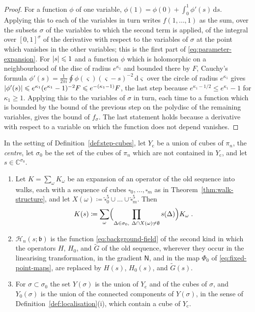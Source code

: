 \documentclass[11pt]{preprint}
\newcommand{\dd}{\mathrm{d}}
\DeclarePairedDelimiter{\abs}{\lvert}{\rvert}
\numberwithin{equation}{section}
\begin{document}
\begin{proof}
For a function $\phi$ of one variable, $\phi(1) = \phi(0) + \int_0^1\phi'(s)\,\dd s$. Applying this to each of the variables in turn writes $f(1, \dots, 1)$ as the sum, over the subsets $\sigma$ of the variables to which the second term is applied, of the integral over $[0, 1]^\sigma$ of the derivative with respect to the variables of $\sigma$ at the point which vanishes in the other variables; this is the first part of \eqref{eq:parameter-expansion}. For $\abs s \leqslant 1$ and a function $\phi$ which is holomorphic on a neighbourhood of the disc of radius $e^{\kappa_1}$ and bounded there by $F$, Cauchy's formula $\phi'(s) = \frac{1}{2\pi i}\oint\phi(\varsigma)(\varsigma - s)^{-2}\,\dd\varsigma$ over the circle of radius $e^{\kappa_1}$ gives $\abs{\phi'(s)} \leqslant e^{\kappa_1}(e^{\kappa_1} - 1)^{-2}F \leqslant e^{-(\kappa_1 - 1)}F$, the last step because $e^{\kappa_1 - 1/2} \leqslant e^{\kappa_1} - 1$ for $\kappa_1 \geqslant 1$. Applying this to the variables of $\sigma$ in turn, each time to a function which is bounded by the bound of the previous step on the polydisc of the remaining variables, gives the bound of $f_\sigma$. The last statement holds because a derivative with respect to a variable on which the function does not depend vanishes.
\end{proof}

\begin{definition}\label{def:parameter-operators}
In the setting of Definition~\ref{def:step-cubes}, let $Y_{\mathrm c}$ be a union of cubes of $\pi_n$, the \emph{centre}, let $\sigma_0$ be the set of the cubes of $\pi_n$ which are not contained in $Y_{\mathrm c}$, and let $s \in \mathbb C^{\sigma_0}$.
\begin{enumerate}[label=(\roman*)]
\item Let $K = \sum_\omega K_\omega$ be an expansion of an operator of the old sequence into walks, each with a sequence of cubes $\square_0, \dots, \square_m$ as in Theorem~\ref{thm:walk-structure}, and let $X(\omega) \coloneqq \tilde\square_0^5 \cup \dots \cup \tilde\square_m^5$. Then
\begin{equation}\label{eq:parameter-operator}
    K(s) \coloneqq \sum_\omega\Bigl(\prod_{\Delta \in \sigma_0,\ \Delta \cap X(\omega) \neq \emptyset}s(\Delta)\Bigr)K_\omega\;.
\end{equation}
\item $\mathcal H_n(s; \mathfrak b)$ is the function \eqref{eq:background-field} of the second kind in which the operators $H$, $H_0$, and $\tilde G$ of the old sequence, wherever they occur in the linearising transformation, in the gradient $\mathsf N$, and in the map $\Phi_0$ of \eqref{eq:fixed-point-maps}, are replaced by $H(s)$, $H_0(s)$, and $\tilde G(s)$.
\item For $\sigma \subset \sigma_0$ the set $Y(\sigma)$ is the union of $Y_{\mathrm c}$ and of the cubes of $\sigma$, and $Y_0(\sigma)$ is the union of the connected components of $Y(\sigma)$, in the sense of Definition~\ref{def:localisation}(i), which contain a cube of $Y_{\mathrm c}$.
\end{enumerate}
\end{definition}
\end{document}
